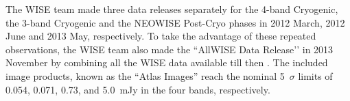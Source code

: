 \documentclass[apj,iop]{emulateapj}
\begin{document}
The WISE team made three data releases separately for the 4-band Cryogenic, the 3-band Cryogenic and the NEOWISE Post-Cryo phases in 2012 March, 2012 June and 2013 May, respectively. To take the advantage of these repeated observations, the WISE team also made the ``AllWISE Data Release’’ in 2013 November by combining all the WISE data available till then \citep[see][for details]{2013wise.rept....1C}. The included image products,
known as the ``Atlas Images'' reach the nominal 5~$\sigma$ limits of 0.054, 0.071, 0.73, and 5.0~mJy in the four bands, respectively. 
\end{document}
